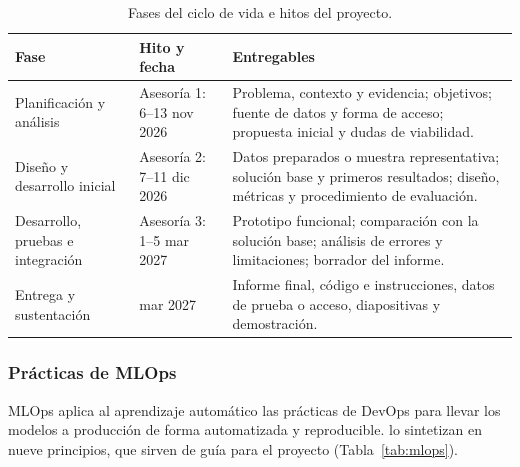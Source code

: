 \begin{table}[htbp]
    \centering
    \caption{Fases del ciclo de vida e hitos del proyecto.}\label{tab:schedule}
    \small
    \begin{tabularx}{\textwidth}{>{\raggedright\arraybackslash}p{3.3cm}
                                 >{\raggedright\arraybackslash}p{2.6cm}
                                 >{\raggedright\arraybackslash}X}
        \toprule
        Fase & Hito y fecha & Entregables \\
        \midrule
        Planificación y análisis & Asesoría 1: 6--13 nov 2026 &
            Problema, contexto y evidencia; objetivos; fuente de datos y forma
            de acceso; propuesta inicial y dudas de viabilidad. \\
        Diseño y desarrollo inicial & Asesoría 2: 7--11 dic 2026 &
            Datos preparados o muestra representativa; solución base y
            primeros resultados; diseño, métricas y procedimiento de
            evaluación. \\
        Desarrollo, pruebas e integración & Asesoría 3: 1--5 mar 2027 &
            Prototipo funcional; comparación con la solución base; análisis
            de errores y limitaciones; borrador del informe. \\
        Entrega y sustentación & 20 mar 2027 &
            Informe final, código e instrucciones, datos de prueba o acceso,
            diapositivas y demostración. \\
        \bottomrule
    \end{tabularx}
\end{table}


\subsubsection{Prácticas de MLOps}\label{sec:mlops}
MLOps aplica al aprendizaje automático las prácticas de DevOps para llevar los
modelos a producción de forma automatizada y reproducible.
\textcite{kreuzberger2023} lo sintetizan en nueve principios, que sirven de
guía para el proyecto (Tabla~\ref{tab:mlops}).

